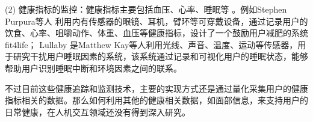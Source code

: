 (2) 健康指标的监控：健康指标主要包括血压、心率、睡眠等 \cite{kay2012lullaby} \cite{gronvall2013beyond} \cite{logan2007mobile} \cite{walters2010a}。例如Stephen Purpura等人 \cite{purpura2011fit4life} 利用内有传感器的眼镜、耳机，臂环等可穿戴设备，通过记录用户的饮食、心率、咀嚼动作、体重、血压等健康指标，设计了一个鼓励用户减肥的系统 fit4life； Lullaby  \cite{kay2012lullaby} 是Matthew Kay等人利用光线、声音、温度、运动等传感器，用于研究干扰用户睡眠因素的系统，该系统通过记录和可视化用户的睡眠状态，能够帮助用户识别睡眠中断和环境因素之间的联系。 


不过目前这些健康追踪和监测技术，主要的实现方式还是通过量化采集用户的健康指标相关的数据。那么如何利用其他的健康相关数据，如面部信息，来支持用户的日常健康，在人机交互领域还没有得到深入研究。




 
